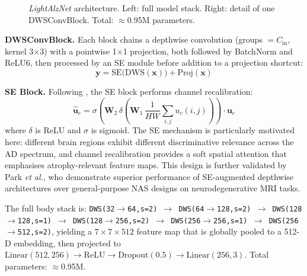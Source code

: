 \documentclass[conference]{IEEEtran}
\newcommand{\etal}{\textit{et al.}\xspace}
\newcommand{\modelname}{\textit{LightAlzNet}\xspace}
\begin{document}
\begin{figure}[htbp]
\caption{\modelname architecture. Left: full model stack.
Right: detail of one DWSConvBlock. Total: $\approx$0.95M
parameters.}
\label{fig:lightalznet}
\end{figure}

\textbf{DWSConvBlock.} Each block chains a depthwise convolution
(groups $= C_\text{in}$, kernel 3$\times$3) with a pointwise
1$\times$1 projection, both followed by BatchNorm and ReLU6,
then processed by an SE module before addition to a projection
shortcut:
\begin{equation}
\mathbf{y} = \mathrm{SE}\!\bigl(\mathrm{DWS}(\mathbf{x})\bigr)
             + \mathrm{Proj}(\mathbf{x})
\label{eq:dwsblock}
\end{equation}

\textbf{SE Block.} Following \cite{hu2018}, the SE block
performs channel recalibration:
\begin{equation}
\hat{\mathbf{u}}_c = \sigma\!\left(
  \mathbf{W}_2\,\delta\!\left(
    \mathbf{W}_1\,\frac{1}{HW}\sum_{i,j}u_c(i,j)
  \right)\right) \cdot \mathbf{u}_c
\label{eq:se}
\end{equation}
where $\delta$ is ReLU and $\sigma$ is sigmoid. The SE mechanism
is particularly motivated here: different brain regions exhibit
different discriminative relevance across the AD spectrum, and
channel recalibration provides a soft spatial attention that
emphasises atrophy-relevant feature maps. This design is further
validated by Park \etal \cite{park2026}, who demonstrate
superior performance of SE-augmented depthwise architectures
over general-purpose NAS designs on neurodegenerative MRI tasks.

The full body stack is:
\texttt{DWS(32$\to$64,s=2) $\to$ DWS(64$\to$128,s=2) $\to$
DWS(128$\to$128,s=1) $\to$ DWS(128$\to$256,s=2) $\to$
DWS(256$\to$256,s=1) $\to$ DWS(256$\to$512,s=2)},
yielding a $7\!\times\!7\!\times\!512$ feature map that is
globally pooled to a 512-D embedding, then projected to
$\mathrm{Linear}(512,256) \to \mathrm{ReLU} \to
\mathrm{Dropout}(0.5) \to \mathrm{Linear}(256,3)$.
Total parameters: $\approx$0.95M.
\end{document}
